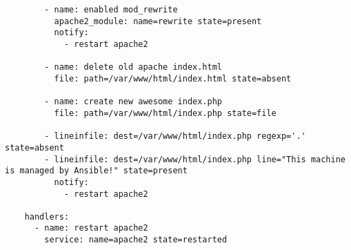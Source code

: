 \begin{appendices}
\begin{lstlisting}
        - name: enabled mod_rewrite
          apache2_module: name=rewrite state=present
          notify:
            - restart apache2

        - name: delete old apache index.html
          file: path=/var/www/html/index.html state=absent

        - name: create new awesome index.php
          file: path=/var/www/html/index.php state=file

        - lineinfile: dest=/var/www/html/index.php regexp='.' state=absent
        - lineinfile: dest=/var/www/html/index.php line="This machine is managed by Ansible!" state=present
          notify:
            - restart apache2

    handlers:
      - name: restart apache2
        service: name=apache2 state=restarted
  \end{lstlisting}

\end{appendices}


